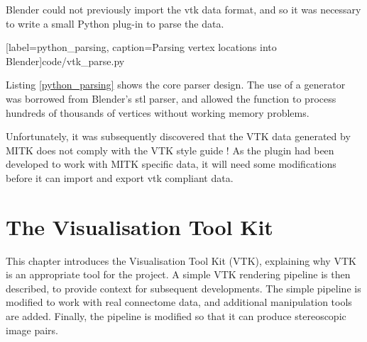 \documentclass[MSc,paper=a4,pagesize=auto]{icldt}
\begin{document}
Blender could not previously import the vtk data format, and so it was necessary to write a small Python plug-in to parse the data.


  [label=python_parsing, caption=Parsing vertex locations into Blender]{code/vtk_parse.py}

Listing \ref{python_parsing} shows the core parser design. The use of a generator was borrowed from Blender's stl parser, and allowed the function to process hundreds of thousands of vertices without working memory problems.

Unfortunately, it was subsequently discovered that the VTK data generated by MITK does not comply with the VTK style guide \cite{VTK_file_formats}! As the plugin had been developed to work with MITK specific data, it will need some modifications before it can import and export vtk compliant data. 

\chapter{The Visualisation Tool Kit}
This chapter introduces the Visualisation Tool Kit (VTK), explaining why VTK is an appropriate tool for the project. A simple VTK rendering pipeline is then described, to provide context for subsequent developments. The simple pipeline is modified to work with real connectome data, and additional manipulation tools are added. Finally, the pipeline is modified so that it can produce stereoscopic image pairs.

\clearpage
\end{document}
